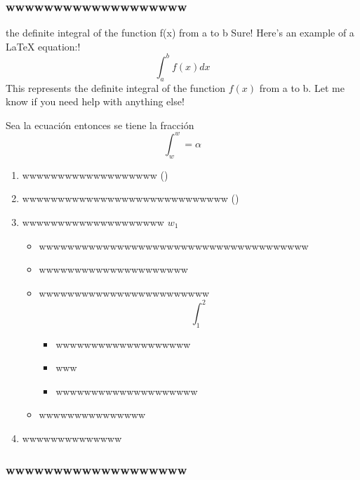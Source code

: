 \documentclass[11pt,aspectratio=1610,spanish]{beamer}
\begin{document}
\subsubsection{wwwwwwwwwwwwwwwwwww}
\begin{frame}
	the definite integral of the function f(x) from a to b
	Sure! Here's an example of a LaTeX equation:!
	\[ \int_{a}^{b} f(x)dx \]
	This represents the definite integral of the function $ f(x) $ from a to b. Let me know if you need help with anything else!

	Sea la ecuación entonces se tiene la fracción
	\begin{equation}\label{key}
		\int_{w}^{w}=\alpha
	\end{equation}
	\begin{enumerate}
		\item wwwwwwwwwwwwwwwwwww (\cite{Hatcher:478079})
		      \cite{einstein}
		\item wwwwwwwwwwwwwwwwwwwwwwwwwwwww (\cite{dirac})
		\item wwwwwwwwwwwwwwwwwwww $ w_1 $
		      \begin{itemize}
			      \item wwwwwwwwwwwwwwwwwwwwwwwwwwwwwwwwwwwwww
			      \item wwwwwwwwwwwwwwwwwwwww
			      \item wwwwwwwwwwwwwwwwwwwwwwww
			            \[ \int_{1}^{2} \]
			            \begin{itemize}
				            \item wwwwwwwwwwwwwwwwwww
				            \item www
				            \item wwwwwwwwwwwwwwwwwwww
			            \end{itemize}
			      \item wwwwwwwwwwwwwww
		      \end{itemize}
		\item wwwwwwwwwwwwww
	\end{enumerate}
\end{frame}


\subsubsection{wwwwwwwwwwwwwwwwwww}
\end{document}

